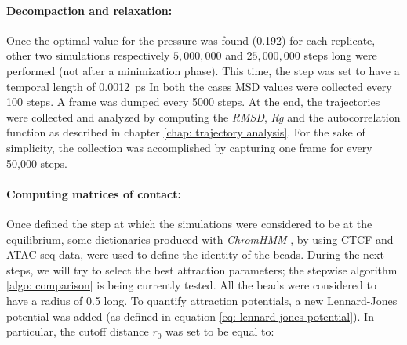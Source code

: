 



\paragraph{Decompaction and relaxation:}

Once the optimal value for the pressure was found (0.192) %
for each replicate, other two simulations respectively $5,000,000$ and $25,000,000$ steps long were performed (not after a minimization phase). This time, the step was set to have a temporal length of \SI{0.0012}{\pico\second} In both the cases MSD values were collected every 100 steps. A frame was dumped every 5000 steps. At the end, the trajectories were collected and analyzed by computing the \textit{RMSD}, \textit{Rg} and the autocorrelation function as described in chapter \ref{chap: trajectory analysis}. For the sake of simplicity, the collection was accomplished by capturing one frame for every 50,000 steps.


\paragraph{Computing matrices of contact:}

Once defined the step at which the simulations were considered to be at the equilibrium, some dictionaries produced with \textit{ChromHMM}
\cite{chilledhousevibesLearningChromatinStates2015,ernstChromatinstateDiscoveryGenome2017}
, by using CTCF and ATAC-seq data, were used to define the identity of the beads. During the next steps, we will try to select the best attraction parameters; the stepwise algorithm \ref{algo: comparison} is being currently tested. All the beads were considered to have a radius of 0.5 %
long. To quantify attraction potentials, a new Lennard-Jones potential was added (as defined in equation \ref{eq: lennard jones potential}). In particular, the cutoff distance $r_0$ was set to be equal to:

